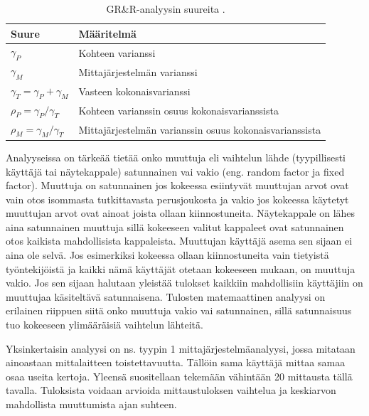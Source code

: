 \documentclass[12pt,a4paper,finnish]{tutthesis}
\begin{document}
\begin{table}[]
\centering
\caption{GR\&R-analyysin suureita \parencite{Burdick2003}.}
\label{table:grr}
\begin{tabular}{@{}ll@{}}
\toprule
Suure                           & Määritelmä                                              \\ \midrule
$\gamma _P$                         & Kohteen varianssi                                       \\
$\gamma _M$                         & Mittajärjestelmän varianssi                             \\
$\gamma _T = \gamma _P + \gamma _M$ & Vasteen kokonaisvarianssi                               \\
$\rho _P = \gamma _P / \gamma _T$   & Kohteen varianssin osuus kokonaisvarianssista           \\
$\rho _M = \gamma _M / \gamma _T$   & Mittajärjestelmän varianssin osuus kokonaisvarianssista
\end{tabular}
\end{table}




Analyyseissa on tärkeää tietää onko muuttuja eli
vaihtelun lähde (tyypillisesti käyttäjä tai näytekappale) satunnainen vai
vakio (eng. random factor ja fixed factor). Muuttuja on satunnainen
jos kokeessa esiintyvät muuttujan arvot ovat vain otos isommasta
tutkittavasta perusjoukosta ja vakio jos kokeessa
käytetyt muuttujan arvot ovat ainoat joista ollaan kiinnostuneita.
Näytekappale on lähes aina satunnainen muuttuja sillä kokeeseen
valitut kappaleet ovat satunnainen otos kaikista mahdollisista kappaleista.
Muuttujan käyttäjä asema sen sijaan ei aina ole selvä. Jos esimerkiksi kokeessa
ollaan kiinnostuneita vain tietyistä työntekijöistä ja kaikki
nämä käyttäjät otetaan kokeeseen mukaan, on muuttuja vakio. Jos sen
sijaan halutaan yleistää tulokset kaikkiin mahdollisiin käyttäjiin on muuttujaa
käsiteltävä satunnaisena. Tulosten matemaattinen analyysi on erilainen riippuen
siitä onko muuttuja vakio vai satunnainen, sillä satunnaisuus tuo kokeeseen
ylimääräisiä vaihtelun lähteitä.


Yksinkertaisin analyysi on ns. tyypin 1 mittajärjestelmäanalyysi, jossa
mitataan ainoastaan mittalaitteen toistettavuutta. Tällöin sama käyttäjä
mittaa samaa osaa useita kertoja. Yleensä suositellaan tekemään
vähintään 20 mittausta tällä tavalla. Tuloksista voidaan arvioida mittaustuloksen
vaihtelua ja keskiarvon mahdollista muuttumista ajan suhteen.
\end{document}
